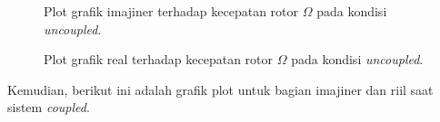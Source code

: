 \begin{figure}[H]
	\centering
	\caption{Plot grafik imajiner terhadap kecepatan rotor $\Omega$ pada kondisi \textit{uncoupled}.}
	\label{fig:imag(uncoupled)}
\end{figure}

\begin{figure}[H]
	\centering
	\caption{Plot grafik real terhadap kecepatan rotor $\Omega$ pada kondisi \textit{uncoupled}.}
	\label{fig:real(uncoupled)}
\end{figure}

Kemudian, berikut ini adalah grafik plot untuk bagian imajiner dan riil saat sistem \textit{coupled}.

